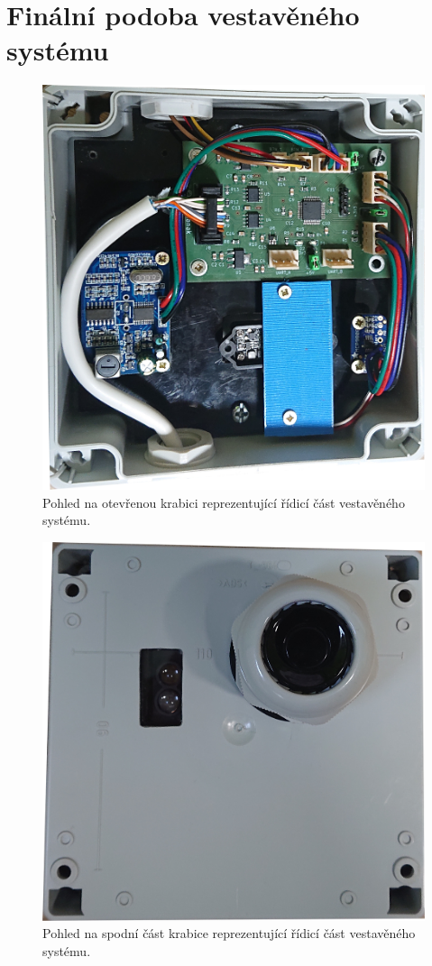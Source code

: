 \chapter{Finální podoba vestavěného systému}
    \label{sec:fotky}

    \begin{figure}[h]
        \centering
        \includegraphics[width=0.6\linewidth]{obrazky-figures/done_01.JPG}
        \caption{Pohled na otevřenou krabici reprezentující řídicí část vestavěného systému.}
    \end{figure}

    \begin{figure}[h]
        \centering
        \includegraphics[width=0.6\linewidth]{obrazky-figures/done_03.JPG}
        \caption{Pohled na spodní část krabice reprezentující řídicí část vestavěného systému.}
    \end{figure}


